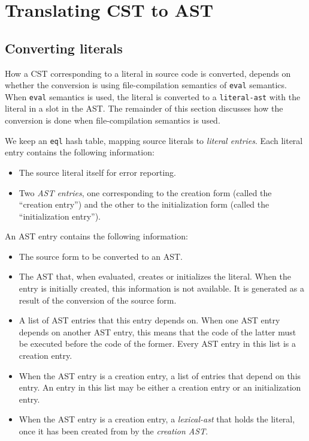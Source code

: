 \chapter{Translating CST to AST}

\section{Converting literals}

How a CST corresponding to a literal in source code is converted,
depends on whether the conversion is using file-compilation semantics
of \texttt{eval} semantics.  When \texttt{eval} semantics is used, the
literal is converted to a \texttt{literal-ast} with the literal in a
slot in the AST.  The remainder of this section discusses how the
conversion is done when file-compilation semantics is used.

We keep an \texttt{eql} hash table, mapping source literals to
\emph{literal entries}.  Each literal entry contains the following
information:

\begin{itemize}
\item The source literal itself for error reporting.
\item Two \emph{AST entries}, one corresponding to the creation form
  (called the ``creation entry'') and the other to the initialization
  form (called the ``initialization entry'').
\end{itemize}

An AST entry contains the following information:

\begin{itemize}
\item The source form to be converted to an AST.
\item The AST that, when evaluated, creates or initializes the
  literal.  When the entry is initially created, this information is
  not available.  It is generated as a result of the conversion of the
  source form.
\item A list of AST entries that this entry depends on.  When one AST
  entry depends on another AST entry, this means that the code of the
  latter must be executed before the code of the former.  Every AST
  entry in this list is a creation entry.
\item When the AST entry is a creation entry, a list of entries that
  depend on this entry.  An entry in this list may be either a
  creation entry or an initialization entry.
\item When the AST entry is a creation entry, a \emph{lexical-ast}
  that holds the literal, once it has been created from by the
  \emph{creation AST}.
\end{itemize}

